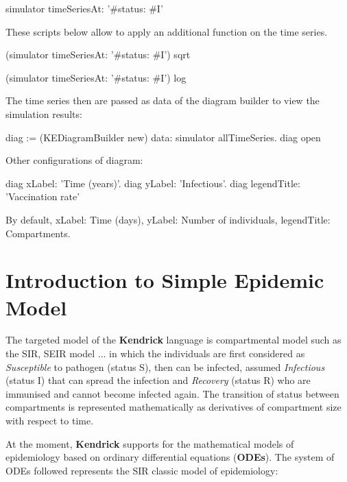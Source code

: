 \documentclass[a4paper,10pt,twoside]{book}
\begin{document}
\begin{code}{}
simulator timeSeriesAt: '{#status: #I}'
\end{code}

These scripts below allow to apply an additional function on the time series.

\begin{code}{}
(simulator timeSeriesAt: '{#status: #I}') sqrt
\end{code}



\begin{code}{}
(simulator timeSeriesAt: '{#status: #I}') log
\end{code}


The time series then are passed as data of the diagram builder to view the simulation results:

\begin{code}{}
diag := (KEDiagramBuilder new) data: simulator allTimeSeries.
diag open
\end{code}

Other configurations of diagram:

\begin{code}{}
diag xLabel: 'Time (years)'.
diag yLabel: 'Infectious'.
diag legendTitle: 'Vaccination rate'
\end{code}

By default, xLabel: Time (days), yLabel: Number of individuals, legendTitle: Compartments.
\chapter{Introduction to Simple Epidemic Model}
The targeted model of the \textbf{Kendrick} language is compartmental model such as the SIR, SEIR model ... in which the individuals are first considered as \textit{Susceptible} to pathogen (status S), then can be infected, assumed \textit{Infectious} (status I) that can spread the infection and \textit{Recovery} (status R) who are immunised and cannot become infected again. The transition of status between compartments is represented mathematically as derivatives of compartment size with respect to time.

At the moment, \textbf{Kendrick} supports for the mathematical models of epidemiology based on ordinary differential equations (\textbf{ODEs}). The system of ODEs followed represents the SIR classic model of epidemiology:
\end{document}
